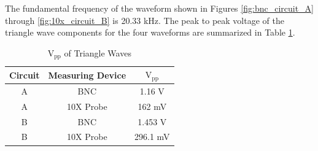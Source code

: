 \documentclass[12pt,letterpaper]{report}
\begin{document}
The fundamental frequency of the waveform shown in Figures \ref{fig:bnc_circuit_A} through \ref{fig:10x_circuit_B} is 20.33 kHz. The peak to peak voltage of the triangle wave components for the four waveforms are summarized in Table \ref{table:vpp}.

\begin{table}[ht]
\caption{$\text{V}_{\text{pp}}$ of Triangle Waves} %
\centering 
    \begin{tabular}{| c | c | c |}
    \hline  
    Circuit & Measuring Device & $\text{V}_{\text{pp}}$ \\
    \hline
    A & BNC & 1.16 V \\
    A & 10X Probe & 162 mV \\
    B & BNC & 1.453 V \\
    B & 10X Probe & 296.1 mV \\
    \hline
    \end{tabular}
    \label{table:vpp}
\end{table}
\end{document}
